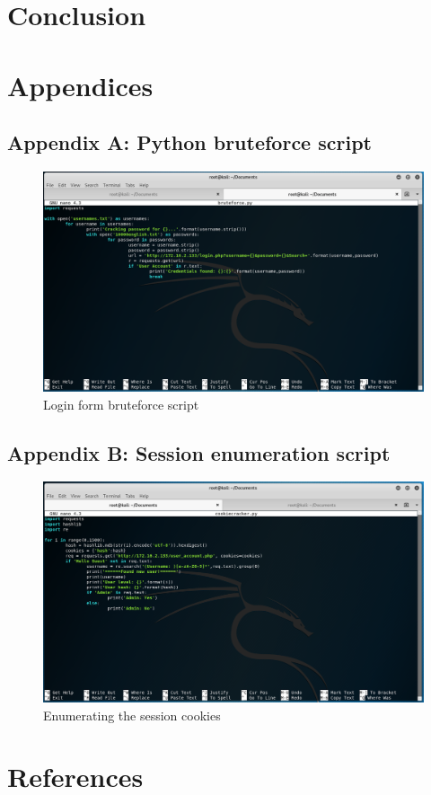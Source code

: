 \documentclass{report}
\begin{document}
\chapter{Conclusion}

\chapter{Appendices}
\section{Appendix A: Python bruteforce script}
\begin{figure}[!htb]
	\centering
	\includegraphics[scale=0.4]{img/bruteforcescript.png}
	\caption{Login form bruteforce script}
\end{figure}
\section{Appendix B: Session enumeration script}
\begin{figure}[!htb]
	\centering
	\includegraphics[scale=0.4]{img/cookiescript.png}
	\caption{Enumerating the session cookies}
\end{figure}

\chapter{References}
\end{document}
